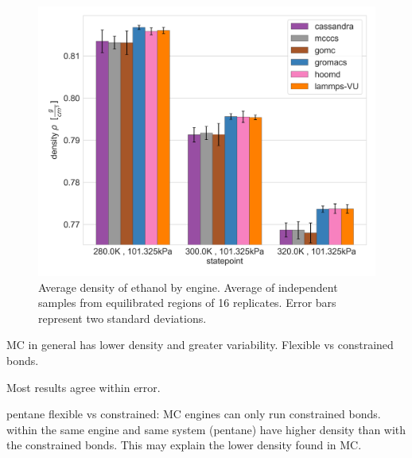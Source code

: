 \begin{figure}[h!]
    \centering
    \includegraphics[width=0.8\linewidth,keepaspectratio]{figures/rep_study/ethanolAA_summary.png}
    \caption{Average density of ethanol by engine. Average of independent samples from equilibrated regions of 16 replicates. Error bars represent two standard deviations.}\label{fig:ethanol_density}
\end{figure}

MC in general has lower density and greater variability. Flexible vs constrained bonds.

Most results agree within error.

pentane flexible vs constrained: MC engines can only run constrained bonds. within the same engine and same system (pentane) have higher density than with the constrained bonds. This may explain the lower density found in MC.


